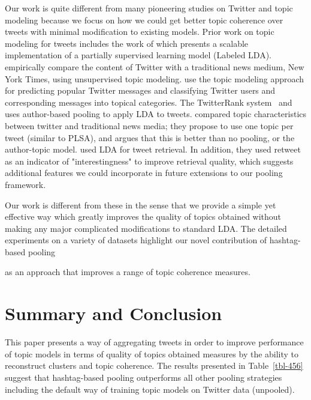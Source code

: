 \documentclass{sig-alternate}
\begin{document}
Our work is quite different from many pioneering studies on Twitter
and topic modeling because we focus on how we could get better
topic coherence over tweets with minimal modification to existing
models. Prior work on topic modeling for tweets includes the work of
\cite{ramage} which presents a scalable implementation of a partially
supervised learning model (Labeled LDA). %
 \cite{wayne} empirically compare the content of Twitter
with a traditional news medium, New York Times, using unsupervised
topic modeling. \cite{hong} use the topic modeling approach for
predicting popular Twitter messages and classifying Twitter users and
corresponding messages into topical categories. %
The {T}witterRank system~\cite{Weng2010wsdm} and \cite{hong} uses author-based pooling to apply LDA to tweets. \cite{wayne} compared
topic characteristics between twitter and traditional news media; they propose to use one topic per tweet (similar to
PLSA), and argues that this is better than no
pooling, or the author-topic model. %
 \cite{Naveed2011cikm} used LDA for tweet retrieval. In
addition, they used retweet as an indicator of "interestingness" to
improve retrieval quality, which suggests additional features we
could incorporate in future extensions to our pooling framework.

Our work is different from these in the sense that we provide a simple
yet effective way which greatly improves the quality of topics
obtained without making any major complicated modifications to
standard LDA. The detailed experiments on a variety of datasets
highlight our novel contribution of hashtag-based pooling  as an approach that improves a range of topic coherence measures.

\section{Summary and Conclusion}

\label{sec:conclusion}

This paper presents a way of aggregating tweets in order to improve performance of topic models in terms of quality of topics obtained measures by the ability to reconstruct clusters and topic coherence. The results presented in Table~\ref{tbl-456} suggest that hashtag-based pooling outperforms all other pooling strategies including the default way of training topic models on Twitter data (unpooled).
\end{document}
